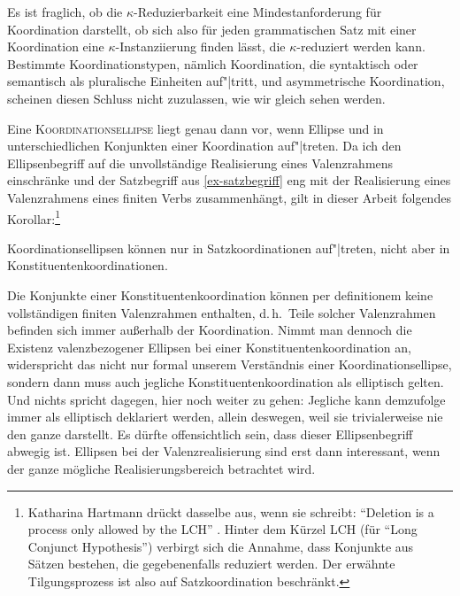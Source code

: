 Es ist fraglich, ob die $\kappa$-Reduzierbarkeit eine Mindestanforderung für Koordination darstellt, ob sich also für jeden grammatischen Satz mit einer Koordination eine $\kappa$-Instanziierung finden lässt, die $\kappa$-reduziert werden kann. Bestimmte Koordinationstypen, nämlich Koordination, die syntaktisch oder semantisch als pluralische Einheiten auf"|tritt, und asymmetrische Koordination, scheinen diesen Schluss nicht zuzulassen, wie wir gleich sehen werden. 

Eine \textsc{Koordinationsellipse} liegt genau dann vor, wenn Ellipse und  in unterschiedlichen Konjunkten einer Koordination auf"|treten. Da ich den Ellipsenbegriff auf die unvollständige Realisierung eines Valenzrahmens einschränke und der Satzbegriff aus \ref{ex-satzbegriff} eng mit der Realisierung eines Valenzrahmens eines finiten Verbs zusammenhängt, gilt in dieser Arbeit folgendes Korollar:\footnote{Katharina Hartmann drückt dasselbe aus, wenn sie schreibt: "`Deletion is a process only allowed by the LCH"' \citep[33]{Hartmann:00}. Hinter dem Kürzel LCH (für "`Long Conjunct Hypothesis"') verbirgt sich die Annahme, dass Konjunkte aus Sätzen bestehen, die gegebenenfalls reduziert werden. Der erwähnte Tilgungsprozess ist also auf Satzkoordination beschränkt. } 
\begin{corollary}
Koordinationsellipsen können nur in Satzkoordinationen auf"|treten, nicht aber in Konstituentenkoordinationen.
\end{corollary}
Die Konjunkte einer Konstituentenkoordination können per definitionem keine vollständigen finiten Valenzrahmen enthalten, d.\,h.\ Teile solcher Valenzrahmen befinden sich immer au\ss erhalb der Koordination. Nimmt man dennoch die Existenz valenzbezogener Ellipsen bei einer Konstituentenkoordination an, widerspricht das nicht nur formal unserem Verständnis einer Koordinationsellipse, sondern dann muss auch jegliche Konstituentenkoordination als elliptisch gelten. Und nichts spricht dagegen, hier noch weiter zu gehen: Jegliche  kann demzufolge immer als elliptisch deklariert werden, allein deswegen, weil sie trivialerweise nie den ganze  darstellt. Es dürfte offensichtlich sein, dass dieser Ellipsenbegriff abwegig ist. Ellipsen bei der Valenzrealisierung sind erst dann interessant, wenn der ganze mögliche Realisierungsbereich betrachtet wird. 

